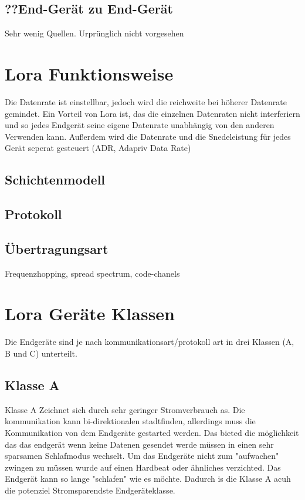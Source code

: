 \documentclass[a4paper,12pt]{article}
\begin{document}
    \subsection{??End-Gerät zu End-Gerät}
    Sehr wenig Quellen. Urprünglich nicht vorgesehen
    \section{Lora Funktionsweise}
    Die Datenrate ist einstellbar, jedoch wird die reichweite bei höherer Datenrate gemindet. Ein Vorteil von Lora ist, das die einzelnen Datenraten nicht interferiern und so jedes Endgerät seine eigene Datenrate unabhängig von den anderen Verwenden kann.
    Außerdem wird die Datenrate und die Snedeleistung für jedes Gerät seperat gesteuert (ADR, Adapriv Data Rate)
        \cite{RFC8376}
        \cite{LoRaSpec}
    \subsection{Schichtenmodell}
    \subsection{Protokoll}
    \subsection{Übertragungsart}
    Frequenzhopping, spread spectrum, code-chanels
    \section{Lora Geräte Klassen}
    Die Endgeräte sind je nach kommunikationsart/protokoll art in drei Klassen (A, B und C) unterteilt. 
        \cite{RFC8376}
        \cite{LoraClasses}
    \subsection{Klasse A}
    Klasse A Zeichnet sich durch sehr geringer Stromverbrauch as. Die kommunikation kann bi-direktionalen stadtfinden, allerdings muss die Kommunikation von dem Endgeräte gestarted werden. Das bieted die möglichkeit das das endgerät wenn keine Datenen gesendet werde müssen in einen sehr 
    sparsamen Schlafmodus wechselt. Um das Endgeräte nicht zum "aufwachen" zwingen zu müssen wurde auf einen Hardbeat oder ähnliches verzichted. Das Endgerät kann so lange "schlafen" wie es möchte. Dadurch is die Klasse A acuh die potenziel Stromsparendste Endgeräteklasse.
\end{document}
